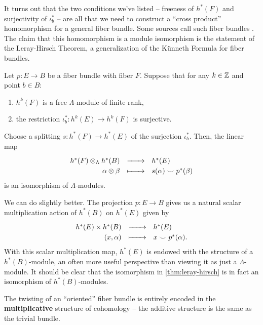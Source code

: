 It turns out that the two conditions we've listed -- freeness of $h^*(F)$ and surjectivity of $\iota_b^*$ -- are all that we need to construct a ``cross product'' homomorphism for a general fiber bundle. Some sources call such fiber bundles . The claim that this homomorphism is a module isomorphism is the statement of the Leray-Hirsch Theorem, a generalization of the K\"unneth Formula for fiber bundles.

\begin{theorem}\label{thm:leray-hirsch} Let $p : E \to B$ be a fiber bundle with fiber $F$. Suppose that for any $k\in \mathbb{Z}$ and point $b\in B$:
  \begin{enumerate}
    \item $h^k(F)$ is a free $\Lambda$-module of finite rank,
    \item the restriction $\iota_b^* : h^k(E) \to h^k(F)$ is surjective.
  \end{enumerate}
  Choose a splitting $s : h^*(F) \to h^*(E)$ of the surjection $\iota_b^*$. Then, the linear map
  \[
    \definefunction{}{h^*(F)\otimes_\Lambda h^*(B)}{h^*(E)}{\alpha\otimes \beta}{s(\alpha)\smile p^*(\beta)}
  \]
  is an isomorphism of $\Lambda$-modules.
\end{theorem}

We can do slightly better. The projection $p : E \to B$ gives us a natural scalar multiplication action of $h^*(B)$ on $h^*(E)$ given by
\[
  \definefunction{}{h^*(E)\times h^*(B)}{h^*(E)}{(x, \alpha)}{x\smile p^*(\alpha).}
\]
With this scalar multiplication map, $h^*(E)$ is endowed with the structure of a $h^*(B)$-module, an often more useful perspective than viewing it as just a $\Lambda$-module. It should be clear that the isomorphism in \cref{thm:leray-hirsch} is in fact an isomorphism of $h^*(B)$-modules.


\begin{insight}
  The twisting of an ``oriented'' fiber bundle is entirely encoded in the \textbf{multiplicative} structure of cohomology -- the additive structure is the same as the trivial bundle.
\end{insight}
